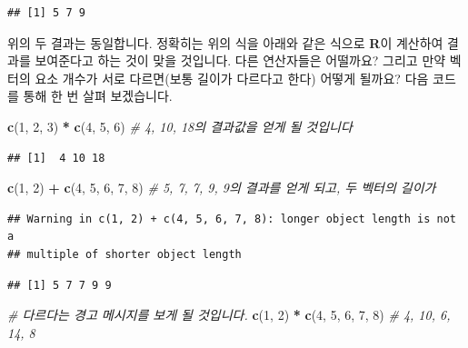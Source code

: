 \documentclass[]{book}
\newenvironment{Shaded}{\begin{snugshade}}{\end{snugshade}}
\newcommand{\CommentTok}[1]{\textcolor[rgb]{0.56,0.35,0.01}{\textit{#1}}}
\newcommand{\DecValTok}[1]{\textcolor[rgb]{0.00,0.00,0.81}{#1}}
\newcommand{\KeywordTok}[1]{\textcolor[rgb]{0.13,0.29,0.53}{\textbf{#1}}}
\newcommand{\NormalTok}[1]{#1}
\newcommand{\OperatorTok}[1]{\textcolor[rgb]{0.81,0.36,0.00}{\textbf{#1}}}
\newcommand{\StringTok}[1]{\textcolor[rgb]{0.31,0.60,0.02}{#1}}
\begin{document}
\begin{verbatim}
## [1] 5 7 9
\end{verbatim}

위의 두 결과는 동일합니다. 정확히는 위의 식을 아래와 같은 식으로 \textbf{R}이 계산하여 결과를 보여준다고 하는 것이 맞을 것입니다. 다른 연산자들은 어떨까요? 그리고 만약 벡터의 요소 개수가 서로 다르면(보통 길이가 다르다고 한다) 어떻게 될까요? 다음 코드를 통해 한 번 살펴 보겠습니다.

\begin{Shaded}
\begin{Highlighting}[]
\KeywordTok{c}\NormalTok{(}\DecValTok{1}\NormalTok{, }\DecValTok{2}\NormalTok{, }\DecValTok{3}\NormalTok{) }\OperatorTok{*}\StringTok{ }\KeywordTok{c}\NormalTok{(}\DecValTok{4}\NormalTok{, }\DecValTok{5}\NormalTok{, }\DecValTok{6}\NormalTok{)     }\CommentTok{# 4, 10, 18의 결과값을 얻게 될 것입니다}
\end{Highlighting}
\end{Shaded}

\begin{verbatim}
## [1]  4 10 18
\end{verbatim}

\begin{Shaded}
\begin{Highlighting}[]
\KeywordTok{c}\NormalTok{(}\DecValTok{1}\NormalTok{, }\DecValTok{2}\NormalTok{) }\OperatorTok{+}\StringTok{ }\KeywordTok{c}\NormalTok{(}\DecValTok{4}\NormalTok{, }\DecValTok{5}\NormalTok{, }\DecValTok{6}\NormalTok{, }\DecValTok{7}\NormalTok{, }\DecValTok{8}\NormalTok{)  }\CommentTok{# 5, 7, 7, 9, 9의 결과를 얻게 되고, 두 벡터의 길이가}
\end{Highlighting}
\end{Shaded}

\begin{verbatim}
## Warning in c(1, 2) + c(4, 5, 6, 7, 8): longer object length is not a
## multiple of shorter object length
\end{verbatim}

\begin{verbatim}
## [1] 5 7 7 9 9
\end{verbatim}

\begin{Shaded}
\begin{Highlighting}[]
                            \CommentTok{# 다르다는 경고 메시지를 보게 될 것입니다.}
\KeywordTok{c}\NormalTok{(}\DecValTok{1}\NormalTok{, }\DecValTok{2}\NormalTok{) }\OperatorTok{*}\StringTok{ }\KeywordTok{c}\NormalTok{(}\DecValTok{4}\NormalTok{, }\DecValTok{5}\NormalTok{, }\DecValTok{6}\NormalTok{, }\DecValTok{7}\NormalTok{, }\DecValTok{8}\NormalTok{)  }\CommentTok{# 4, 10, 6, 14, 8}
\end{Highlighting}
\end{Shaded}
\end{document}
